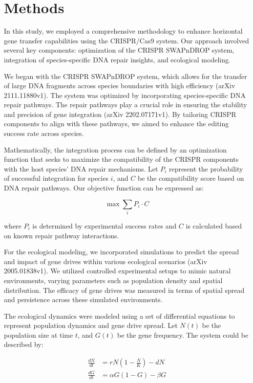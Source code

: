 \documentclass{article}
\begin{document}
\section{Methods}
In this study, we employed a comprehensive methodology to enhance horizontal gene transfer capabilities using the CRISPR/Cas9 system. Our approach involved several key components: optimization of the CRISPR SWAPnDROP system, integration of species-specific DNA repair insights, and ecological modeling.

We began with the CRISPR SWAPnDROP system, which allows for the transfer of large DNA fragments across species boundaries with high efficiency (arXiv 2111.11880v1). The system was optimized by incorporating species-specific DNA repair pathways. The repair pathways play a crucial role in ensuring the stability and precision of gene integration (arXiv 2202.07171v1). By tailoring CRISPR components to align with these pathways, we aimed to enhance the editing success rate across species.

Mathematically, the integration process can be defined by an optimization function that seeks to maximize the compatibility of the CRISPR components with the host species' DNA repair mechanisms. Let \( P_i \) represent the probability of successful integration for species \( i \), and \( C \) be the compatibility score based on DNA repair pathways. Our objective function can be expressed as:

\[
\max \sum_i P_i \cdot C
\]

where \( P_i \) is determined by experimental success rates and \( C \) is calculated based on known repair pathway interactions.

For the ecological modeling, we incorporated simulations to predict the spread and impact of gene drives within various ecological scenarios (arXiv 2005.01838v1). We utilized controlled experimental setups to mimic natural environments, varying parameters such as population density and spatial distribution. The efficacy of gene drives was measured in terms of spatial spread and persistence across these simulated environments.

The ecological dynamics were modeled using a set of differential equations to represent population dynamics and gene drive spread. Let \( N(t) \) be the population size at time \( t \), and \( G(t) \) be the gene frequency. The system could be described by:

\[
\begin{align*}
\frac{dN}{dt} &= rN(1 - \frac{N}{K}) - dN \\
\frac{dG}{dt} &= \alpha G(1 - G) - \beta G
\end{align*}
\]
\end{document}
